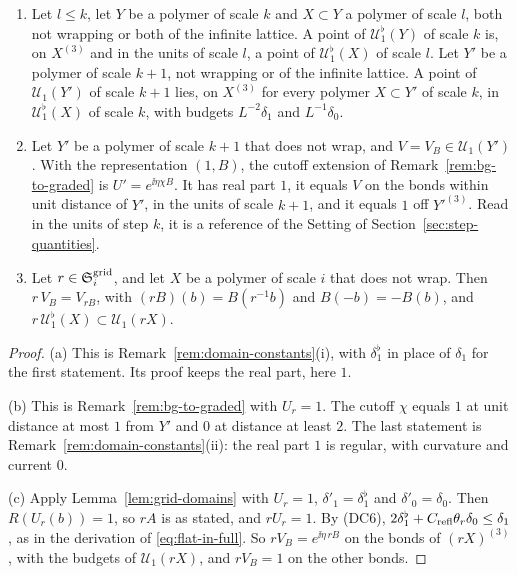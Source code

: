 \begin{lemma}\label{lem:gl-flat}
\begin{enumerate}[label=(\alph*)]
\item Let $l\le k$, let $Y$ be a polymer of scale $k$ and $X\subset Y$ a polymer of scale $l$, both not wrapping or both of the infinite lattice. A point of $\mathcal U^\flat_1(Y)$ of scale $k$ is, on $X^{(3)}$ and in the units of scale $l$, a point of $\mathcal U^\flat_1(X)$ of scale $l$. Let $Y'$ be a polymer of scale $k+1$, not wrapping or of the infinite lattice. A point of $\mathcal U_1(Y')$ of scale $k+1$ lies, on $X^{(3)}$ for every polymer $X\subset Y'$ of scale $k$, in $\mathcal U^\flat_1(X)$ of scale $k$, with budgets $L^{-2}\delta_1$ and $L^{-1}\delta_0$.
\item Let $Y'$ be a polymer of scale $k+1$ that does not wrap, and $V=V_B\in\mathcal U_1(Y')$. With the representation $(1,B)$, the cutoff extension of Remark~\ref{rem:bg-to-graded} is $U'=e^{\ii\eta\chi B}$. It has real part $1$, it equals $V$ on the bonds within unit distance of $Y'$, in the units of scale $k+1$, and it equals $1$ off $Y'^{(3)}$. Read in the units of step $k$, it is a reference of the Setting of Section~\ref{sec:step-quantities}.
\item Let $r\in\mathfrak S^{\rm grid}_i$, and let $X$ be a polymer of scale $i$ that does not wrap. Then $r\,V_B=V_{rB}$, with $(rB)(b)=B(r^{-1}b)$ and $B(-b)=-B(b)$, and $r\,\mathcal U^\flat_1(X)\subset\mathcal U_1(rX)$.
\end{enumerate}
\end{lemma}

\begin{proof}
(a) This is Remark~\ref{rem:domain-constants}(i), with $\delta_1^\flat$ in place of $\delta_1$ for the first statement. Its proof keeps the real part, here $1$.

(b) This is Remark~\ref{rem:bg-to-graded} with $U_r=1$. The cutoff $\chi$ equals $1$ at unit distance at most $1$ from $Y'$ and $0$ at distance at least $2$. The last statement is Remark~\ref{rem:domain-constants}(ii): the real part $1$ is regular, with curvature and current $0$.

(c) Apply Lemma~\ref{lem:grid-domains} with $U_r=1$, $\delta'_1=\delta_1^\flat$ and $\delta'_0=\delta_0$. Then $R(U_r(b))=1$, so $rA$ is as stated, and $rU_r=1$. By (DC6), $2\delta_1^\flat+C_{\rm refl}\theta_r\delta_0\le\delta_1$, as in the derivation of \eqref{eq:flat-in-full}. So $rV_B=e^{\ii\eta\,rB}$ on the bonds of $(rX)^{(3)}$, with the budgets of $\mathcal U_1(rX)$, and $rV_B=1$ on the other bonds.
\end{proof}

